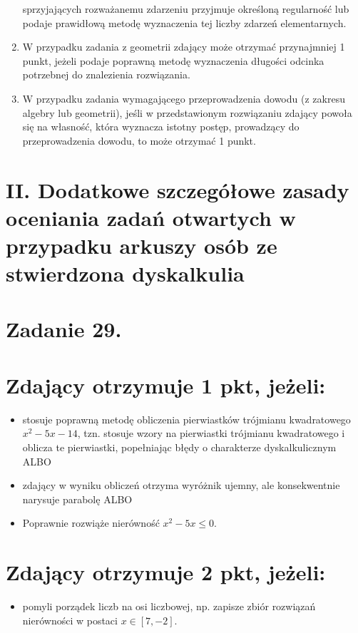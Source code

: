 \documentclass[10pt]{article}
\begin{document}
\begin{enumerate}
sprzyjających rozważanemu zdarzeniu przyjmuje określoną regularność lub podaje prawidłową metodę wyznaczenia tej liczby zdarzeń elementarnych.
  \item W przypadku zadania z geometrii zdający może otrzymać przynajmniej 1 punkt, jeżeli podaje poprawną metodę wyznaczenia długości odcinka potrzebnej do znalezienia rozwiązania.
  \item W przypadku zadania wymagającego przeprowadzenia dowodu (z zakresu algebry lub geometrii), jeśli w przedstawionym rozwiązaniu zdający powoła się na własność, która wyznacza istotny postęp, prowadzący do przeprowadzenia dowodu, to może otrzymać 1 punkt.
\end{enumerate}

\section*{II. Dodatkowe szczegółowe zasady oceniania zadań otwartych w przypadku arkuszy osób ze stwierdzona dyskalkulia}
\section*{Zadanie 29.}
\section*{Zdający otrzymuje 1 pkt, jeżeli:}
\begin{itemize}
  \item stosuje poprawną metodę obliczenia pierwiastków trójmianu kwadratowego $x^{2}-5 x-14$, tzn. stosuje wzory na pierwiastki trójmianu kwadratowego i oblicza te pierwiastki, popełniając błędy o charakterze dyskalkulicznym\\
ALBO
  \item zdający w wyniku obliczeń otrzyma wyróżnik ujemny, ale konsekwentnie narysuje parabolę ALBO
  \item Poprawnie rozwiąże nierówność $x^{2}-5 x \leq 0$.
\end{itemize}

\section*{Zdający otrzymuje 2 pkt, jeżeli:}
\begin{itemize}
  \item pomyli porządek liczb na osi liczbowej, np. zapisze zbiór rozwiązań nierówności w postaci $x \in[7,-2]$.
\end{itemize}
\end{document}
